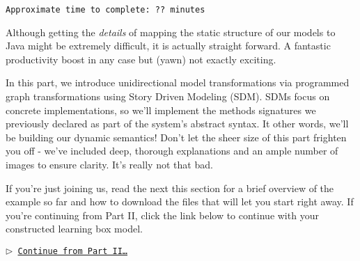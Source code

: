 \genHeader

{\scriptsize \texttt{Approximate time to complete: ?? minutes} }


Although getting the \emph{details} of mapping the static structure of our models to Java might be extremely difficult, it is actually straight forward.
A fantastic productivity boost in any case but (yawn) not exactly exciting.

In this part, we introduce unidirectional model transformations via programmed graph transformations using Story Driven Modeling (SDM). SDMs focus on concrete
implementations, so we'll implement the methods signatures we previously declared as part of the system's abstract syntax. It other words, we'll be building
our dynamic semantics! Don't let the sheer size of this part frighten you off - we've included deep, thorough explanations and an ample number of images to
ensure clarity. It's really not that bad.

If you're just joining us, read the next this section for a brief overview of the example so far and how to download the files that will let you start right away. 
If you're continuing from Part II, click the link below to continue with your constructed learning box model.

\begin{center}\texttt{$\triangleright$ \hyperlink{explanation}{Continue from Part II\ldots}}\end{center}
